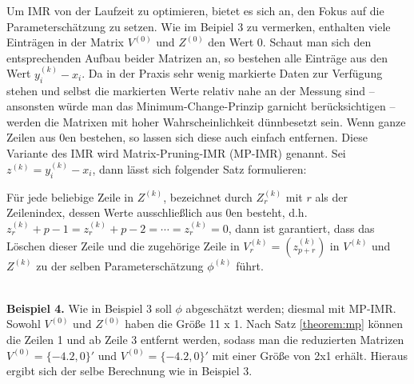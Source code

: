 Um IMR von der Laufzeit zu optimieren, bietet es sich an, den Fokus auf die
Parameterschätzung zu setzen. Wie im Beipiel 3 zu vermerken, enthalten viele
Einträgen in der Matrix $V^{(0)}$ und $Z^{(0)}$ den Wert 0. Schaut man sich den
entsprechenden Aufbau beider Matrizen an, so bestehen alle Einträge aus den
Wert $y^{(k)}_i - x_i$. Da in der Praxis sehr wenig markierte Daten zur
Verfügung stehen und selbst die markierten Werte relativ nahe an der Messung
sind -- ansonsten würde man das Minimum-Change-Prinzip garnicht berücksichtigen
-- werden die Matrixen mit hoher Wahrscheinlichkeit dünnbesetzt sein. Wenn
ganze Zeilen aus 0en bestehen, so lassen sich diese auch einfach entfernen.
Diese Variante des IMR wird Matrix-Pruning-IMR (MP-IMR) genannt. Sei $z^{(k)} =
y^{(k)}_i - x_i$, dann lässt sich folgender Satz formulieren:
\begin{theorem}
    Für jede beliebige Zeile in $Z^{(k)}$, bezeichnet durch $Z^{(k)}_r$ mit $r$
    als der Zeilenindex, dessen Werte ausschließlich aus 0en besteht, d.h.
    $z^{(k)}_r+p-1 = z^{(k)}_r+p-2 = \cdots = z_r^{(k)} = 0$,  dann ist
    garantiert, dass das Löschen dieser Zeile und die zugehörige Zeile in
    $V_r^{(k)} = \left(z^{(k)}_{p+r}\right)$ in $V^{(k)}$ und $Z^{(k)}$ zu der
    selben Parameterschätzung $\phi^{(k)}$ führt.
    \label{theorem:mp}
\end{theorem}
~\\
\textbf{Beispiel 4.} Wie in Beispiel 3 soll $\phi$ abgeschätzt werden; diesmal
mit MP-IMR.  Sowohl $V^{(0)}$ und $Z^{(0)}$ haben die Größe 11 x 1. Nach Satz
\ref{theorem:mp} können die Zeilen 1 und ab Zeile 3 entfernt werden, sodass man
die reduzierten Matrizen $V^{(0)} = \{-4.2, 0\}'$ und $V^{(0)} = \{-4.2, 0\}'$
mit einer Größe von 2x1 erhält. Hieraus ergibt sich der selbe Berechnung wie in
Beispiel 3.

